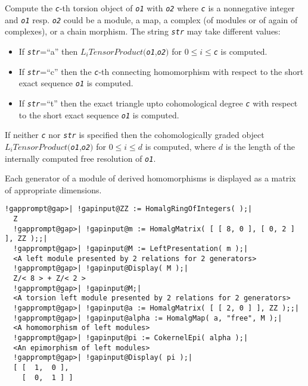 \documentclass[a4paper,11pt]{report}
\begin{document}
{{{ Compute the \mbox{\texttt{\mdseries\slshape c}}-th torsion object of \mbox{\texttt{\mdseries\slshape o1}} with \mbox{\texttt{\mdseries\slshape o2}} where \mbox{\texttt{\mdseries\slshape c}} is a nonnegative integer and \mbox{\texttt{\mdseries\slshape o1}} resp. \mbox{\texttt{\mdseries\slshape o2}} could be a module, a map, a complex (of modules or of again of complexes), or
a chain morphism. The string \mbox{\texttt{\mdseries\slshape str}} may take different values: 
\begin{itemize}
\item If \mbox{\texttt{\mdseries\slshape str}}=``a'' then $L_i TensorProduct($\mbox{\texttt{\mdseries\slshape o1}},\mbox{\texttt{\mdseries\slshape o2}}$)$ for $0 \leq i \leq$\mbox{\texttt{\mdseries\slshape c}} is computed.
\item If \mbox{\texttt{\mdseries\slshape str}}=``c'' then the \mbox{\texttt{\mdseries\slshape c}}-th connecting homomorphism with respect to the short exact sequence \mbox{\texttt{\mdseries\slshape o1}} is computed.
\item If \mbox{\texttt{\mdseries\slshape str}}=``t'' then the exact triangle upto cohomological degree \mbox{\texttt{\mdseries\slshape c}} with respect to the short exact sequence \mbox{\texttt{\mdseries\slshape o1}} is computed.
\end{itemize}
 If neither \mbox{\texttt{\mdseries\slshape c}} nor \mbox{\texttt{\mdseries\slshape str}} is specified then the cohomologically graded object $L_i TensorProduct($\mbox{\texttt{\mdseries\slshape o1}},\mbox{\texttt{\mdseries\slshape o2}}$)$ for $0 \leq i \leq d$ is computed, where $d$ is the length of the internally computed free resolution of \mbox{\texttt{\mdseries\slshape o1}}. 

 Each generator of a module of derived homomorphisms is displayed as a matrix
of appropriate dimensions. 
\begin{Verbatim}[commandchars=!@|,fontsize=\small,frame=single,label=Example]
  !gapprompt@gap>| !gapinput@ZZ := HomalgRingOfIntegers( );|
  Z
  !gapprompt@gap>| !gapinput@m := HomalgMatrix( [ [ 8, 0 ], [ 0, 2 ] ], ZZ );;|
  !gapprompt@gap>| !gapinput@M := LeftPresentation( m );|
  <A left module presented by 2 relations for 2 generators>
  !gapprompt@gap>| !gapinput@Display( M );|
  Z/< 8 > + Z/< 2 >
  !gapprompt@gap>| !gapinput@M;|
  <A torsion left module presented by 2 relations for 2 generators>
  !gapprompt@gap>| !gapinput@a := HomalgMatrix( [ [ 2, 0 ] ], ZZ );;|
  !gapprompt@gap>| !gapinput@alpha := HomalgMap( a, "free", M );|
  <A homomorphism of left modules>
  !gapprompt@gap>| !gapinput@pi := CokernelEpi( alpha );|
  <An epimorphism of left modules>
  !gapprompt@gap>| !gapinput@Display( pi );|
  [ [  1,  0 ],
    [  0,  1 ] ]
  

\end{Verbatim}}}}
\end{document}
